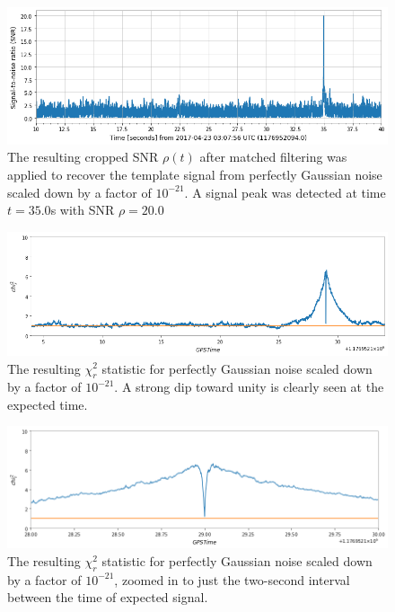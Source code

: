 \documentclass[preprint,
letterpaper,
 amsmath,amssymb,
 aps,
]{revtex4-2}
\begin{document}
\begin{widetext}
\begin{figure}[t]
\includegraphics[width = .9\textwidth]{gaussian -21 template 1.png}
\caption{The resulting cropped SNR $\rho(t)$ after matched filtering was applied to recover the template signal from perfectly Gaussian noise scaled down by a factor of $10^{-21}$. A signal peak was detected at time $t = 35.0$s with SNR $\rho = 20.0$}
\centering
\end{figure} 

\begin{figure}[t]
\includegraphics[width = .9\textwidth]{chi2 gaussian zoomed.png}
\caption{The resulting $\chi^2_r$ statistic for perfectly Gaussian noise scaled down by a factor of $10^{-21}$. A strong dip toward unity is clearly seen at the expected time.}
\centering
\end{figure} 

\begin{figure}[t]
\includegraphics[width = .9\textwidth]{chi2 gaussian.png}
\caption{The resulting $\chi^2_r$ statistic for perfectly Gaussian noise scaled down by a factor of $10^{-21}$, zoomed in to just the two-second interval between the time of expected signal.}
\centering
\end{figure} 


\end{widetext}
\end{document}
